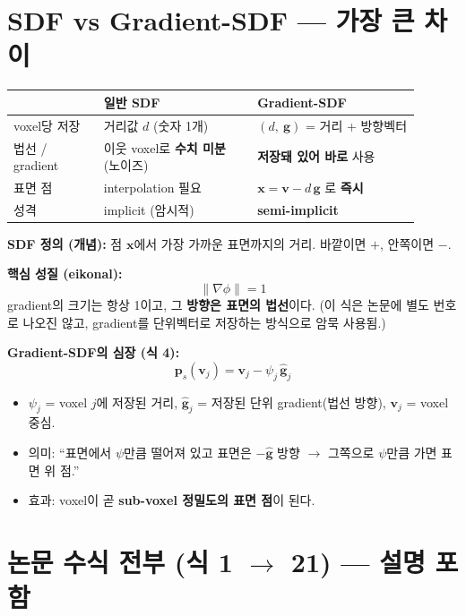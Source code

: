 \section{SDF vs Gradient-SDF --- 가장 큰 차이}

\begin{longtable}{p{0.20\linewidth}p{0.34\linewidth}p{0.36\linewidth}}
\toprule
 & \textbf{일반 SDF} & \textbf{Gradient-SDF} \\
\midrule
voxel당 저장 & 거리값 $d$ (숫자 1개) & $(d,\ \mathbf{g})$ = 거리 + 방향벡터 \\
법선 / gradient & 이웃 voxel로 \textbf{수치 미분} (노이즈) &
  \textbf{저장돼 있어 바로} 사용 \\
표면 점 & interpolation 필요 &
  $\mathbf{x}=\mathbf{v}-d\,\mathbf{g}$ 로 \textbf{즉시} \\
성격 & implicit (암시적) & \textbf{semi-implicit} \\
\bottomrule
\end{longtable}

\textbf{SDF 정의 (개념):} 점 $\mathbf{x}$에서 가장 가까운 표면까지의 거리.
바깥이면 $+$, 안쪽이면 $-$.

\textbf{핵심 성질 (eikonal):}
\begin{equation*}
  \lVert \nabla \phi \rVert = 1
\end{equation*}
gradient의 크기는 항상 1이고, 그 \textbf{방향은 표면의 법선}이다. (이 식은
논문에 별도 번호로 나오진 않고, gradient를 단위벡터로 저장하는 방식으로 암묵
사용됨.)

\textbf{Gradient-SDF의 심장 (식 4):}
\begin{equation*}
  \mathbf{p}_s(\mathbf{v}_j) = \mathbf{v}_j - \psi_j\,\hat{\mathbf{g}}_j
  \tag{4}
\end{equation*}
\begin{itemize}
  \item $\psi_j$ = voxel $j$에 저장된 거리, $\hat{\mathbf{g}}_j$ = 저장된 단위
  gradient(법선 방향), $\mathbf{v}_j$ = voxel 중심.
  \item 의미: ``표면에서 $\psi$만큼 떨어져 있고 표면은 $-\hat{\mathbf{g}}$
  방향 $\rightarrow$ 그쪽으로 $\psi$만큼 가면 표면 위 점.''
  \item 효과: voxel이 곧 \textbf{sub-voxel 정밀도의 표면 점}이 된다.
\end{itemize}

\section{논문 수식 전부 (식 1 $\to$ 21) --- 설명 포함}

